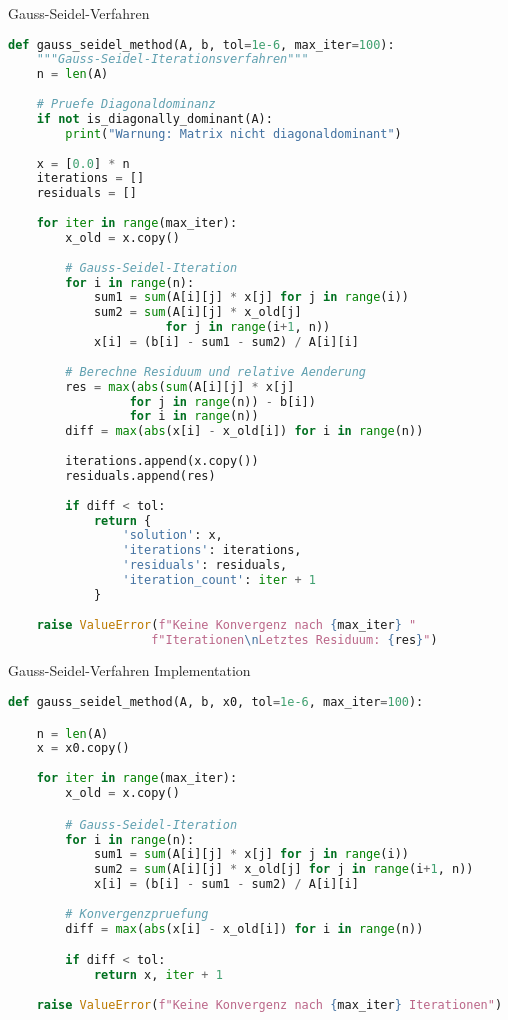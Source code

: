 \begin{examplecode}{Gauss-Seidel-Verfahren}
\begin{lstlisting}[language=Python, style=basesmol]
def gauss_seidel_method(A, b, tol=1e-6, max_iter=100):
    """Gauss-Seidel-Iterationsverfahren"""
    n = len(A)
    
    # Pruefe Diagonaldominanz
    if not is_diagonally_dominant(A):
        print("Warnung: Matrix nicht diagonaldominant")
    
    x = [0.0] * n
    iterations = []
    residuals = []
    
    for iter in range(max_iter):
        x_old = x.copy()
        
        # Gauss-Seidel-Iteration
        for i in range(n):
            sum1 = sum(A[i][j] * x[j] for j in range(i))
            sum2 = sum(A[i][j] * x_old[j] 
                      for j in range(i+1, n))
            x[i] = (b[i] - sum1 - sum2) / A[i][i]
            
        # Berechne Residuum und relative Aenderung
        res = max(abs(sum(A[i][j] * x[j] 
                 for j in range(n)) - b[i]) 
                 for i in range(n))
        diff = max(abs(x[i] - x_old[i]) for i in range(n))
        
        iterations.append(x.copy())
        residuals.append(res)
        
        if diff < tol:
            return {
                'solution': x,
                'iterations': iterations,
                'residuals': residuals,
                'iteration_count': iter + 1
            }
            
    raise ValueError(f"Keine Konvergenz nach {max_iter} "
                    f"Iterationen\nLetztes Residuum: {res}")
\end{lstlisting}
\end{examplecode}

\begin{examplecode}{Gauss-Seidel-Verfahren Implementation}
\begin{lstlisting}[language=Python, style=basesmol]
def gauss_seidel_method(A, b, x0, tol=1e-6, max_iter=100):

    n = len(A)
    x = x0.copy()
    
    for iter in range(max_iter):
        x_old = x.copy()

        # Gauss-Seidel-Iteration
        for i in range(n):
            sum1 = sum(A[i][j] * x[j] for j in range(i))
            sum2 = sum(A[i][j] * x_old[j] for j in range(i+1, n))
            x[i] = (b[i] - sum1 - sum2) / A[i][i]
            
        # Konvergenzpruefung
        diff = max(abs(x[i] - x_old[i]) for i in range(n))

        if diff < tol:
            return x, iter + 1
            
    raise ValueError(f"Keine Konvergenz nach {max_iter} Iterationen")
\end{lstlisting}
\end{examplecode}

